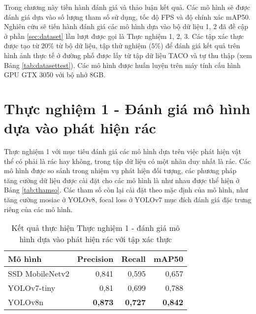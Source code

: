 \documentclass[../the.tex]{subfiles}
\begin{document}
{\fontsize{13}{12} \selectfont
Trong chương này tiền hành đánh giá và thảo luận kết quả. Các mô hình sẽ được đánh giá dựa vào số lượng tham số sử dụng, tốc độ FPS và độ chính xác mAP50.
Nghiên cứu sẽ tiến hành đánh giá các mô hình dựa vào bộ dữ liệu 1, 2 đã đề cập ở phần \ref{sec:dataset} lần lượt được gọi là Thực nghiệm 1, 2, 3.
Các tập xác thực được tạo từ $20\%$ từ bộ dữ liệu, tập thử nghiệm ($5\%$) để đánh giá kết quả trên hình ảnh thực tế ở đường phố được lấy từ tập dữ liệu TACO và tự thu thập (xem Bảng \ref{tab:datasettest}).
Các mô hình được huấn luyện trên máy tính cấu hình GPU GTX 3050 với bộ nhớ 8GB.

}

\section{Thực nghiệm 1 - Đánh giá mô hình dựa vào phát hiện rác}

{\fontsize{13}{12} \selectfont

Thực nghiệm 1 với mục tiêu đánh giá các mô hình dựa trên việc phát hiện vật thể có phải là rác hay không, trong tập dữ liệu có một nhãn duy nhất là rác.
Các mô hình được so sánh trong nhiệm vụ phát hiện đối tượng, các phương pháp tăng cường dữ liệu được cài đặt cho các mô hình là như nhau được thể hiện ở Bảng \ref{tab:thamso}.
Các tham số còn lại cài đặt theo mặc định của mô hình, như tăng cường mosiac ở YOLOv8, focal loss ở YOLOv7 mục đích đánh giá đặc trưng riêng của các mô hình.

}
\begin{table}[h!]
    \centering
    \caption{Kết quả thực hiện Thực nghiệm 1 - đánh giá mô hình dựa vào phát hiện rác với tập xác thực}
    \begin{tabular}{|l|r|r|r|}
        \hline
        \textbf{Mô hình}  & \textbf{Precision} & \textbf{Recall} & \textbf{mAP50} \\ \hline
        SSD   MobileNetv2 & 0,841              & 0,595           & 0,657          \\ \hline
        YOLOv7-tiny       & 0,81               & 0,699           & 0,788          \\ \hline
        YOLOv8n           & \textbf{0,873}     & \textbf{0,727}  & \textbf{0,842} \\ \hline
    \end{tabular}
    \label{tab:thucnghiem1.1}
\end{table}
\end{document}
